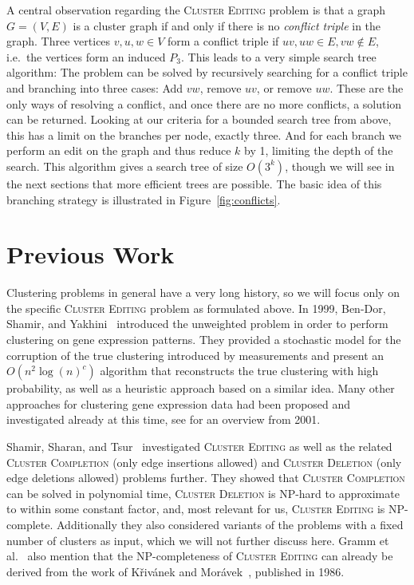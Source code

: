 \documentclass[12pt,oneside,english,parskip=full,headings=small]{scrbook}
\theoremstyle{definition}
\begin{document}
A central observation regarding the \textsc{Cluster Editing} problem is that a graph $G = (V, E)$ is
a cluster graph if and only if there is no \emph{conflict triple} in the graph. Three vertices $v,
u, w \in V$ form a conflict triple if $uv, uw \in E, vw \notin E$, i.e.\ the vertices form an
induced $P_3$. This leads to a very simple search tree algorithm: The problem can be solved by
recursively searching for a conflict triple and branching into three cases: Add $vw$, remove $uv$,
or remove $uw$. These are the only ways of resolving a conflict, and once there are no more
conflicts, a solution can be returned. Looking at our criteria for a bounded search tree from above,
this has a limit on the branches per node, exactly three. And for each branch we perform an edit on
the graph and thus reduce $k$ by 1, limiting the depth of the search. This algorithm gives a search
tree of size $O(3^k)$, though we will see in the next sections that more efficient trees are
possible. The basic idea of this branching strategy is illustrated in Figure~\ref{fig:conflicts}.

\chapter{Previous Work}


Clustering problems in general have a very long history, so we will focus only on the specific
\textsc{Cluster Editing} problem as formulated above. In 1999, Ben-Dor, Shamir, and
Yakhini~\cite{BenDor} introduced the unweighted problem in order to perform clustering on gene
expression patterns. They provided a stochastic model for the corruption of the true clustering
introduced by measurements and present an $O(n^2 \log(n)^c)$ algorithm that reconstructs the true
clustering with high probability, as well as a heuristic approach based on a similar idea. Many
other approaches for clustering gene expression data had been proposed and investigated already at
this time, see \cite{ShamirOverview} for an overview from 2001.

Shamir, Sharan, and Tsur~\cite{ShamirModifications} investigated \textsc{Cluster Editing} as well as
the related \textsc{Cluster Completion} (only edge insertions allowed) and \textsc{Cluster Deletion}
(only edge deletions allowed) problems further. They showed that \textsc{Cluster Completion} can be
solved in polynomial time, \textsc{Cluster Deletion} is NP-hard to approximate to within some
constant factor, and, most relevant for us, \textsc{Cluster Editing} is NP-complete.  Additionally
they also considered variants of the problems with a fixed number of clusters as input, which we
will not further discuss here. Gramm et al.~\cite{Gramm} also mention that the NP-completeness of
\textsc{Cluster Editing} can already be derived from the work of Křivánek and
Morávek~\cite{Krivanek}, published in 1986.
\end{document}
